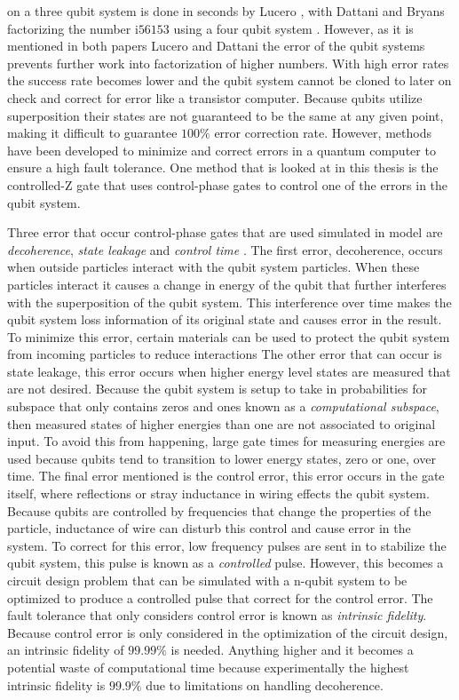 on a three qubit system is done in seconds by Lucero \cite{Lucero2013}, with Dattani and Bryans \cite{Dattani2014} factorizing the number i$56153$ using a four qubit system . However, as it is mentioned in both papers Lucero \cite{Lucero2013} and Dattani \cite{Dattani2014} the error of the qubit systems prevents further work into factorization of higher numbers. With high error rates the success rate becomes lower and the qubit system cannot be cloned to later on check and correct for
error like a transistor computer. Because qubits utilize superposition their states are not guaranteed to be the same at any given point, making it difficult to guarantee $100\%$ error correction rate. However, methods have been developed to minimize and correct errors in a quantum computer to ensure a high fault tolerance. One method that is looked at in this thesis is the controlled-Z gate that uses control-phase gates to control one of the errors in the qubit system. 

Three error that occur control-phase gates that are used simulated in model are \textit{decoherence}, \textit{state leakage} and \textit{control time} \cite{Barends2014}. The first error, decoherence, occurs when outside particles interact with the qubit system particles. When these particles interact it causes a change in energy of the qubit that further interferes with the superposition of the qubit system. This interference over time makes the qubit system loss information of its original
state and causes error in the result. To minimize this error, certain materials can be used to protect the qubit system from incoming particles to reduce interactions
The other error that can occur is state leakage, this error occurs when higher energy level states are measured that are not desired. Because the qubit system is setup to take in probabilities for subspace that only contains zeros and ones known as a \textit{computational subspace}, then measured states of higher energies than one are not associated to original input. To avoid this from happening, large gate times for measuring energies are used because qubits tend to transition to lower
energy states, zero or one, over time.
The final error mentioned is the control error, this error occurs in the gate itself, where reflections or stray inductance in wiring effects the qubit system. Because qubits are controlled by frequencies that change the properties of the particle, inductance of wire can disturb this control and cause error in the system. To correct for this error, low frequency pulses are sent in to stabilize the qubit system, this pulse is known as a \textit{controlled} pulse. However, this becomes a
circuit design problem that can be simulated with a n-qubit system to be optimized to produce a controlled pulse that correct for the control error. The fault tolerance that only considers control error is known as \textit{intrinsic fidelity}. Because control error is only considered in the optimization of the circuit design, an intrinsic fidelity of $99.99\%$ is needed. Anything higher and it becomes a potential waste of computational time because experimentally the highest intrinsic
fidelity is $99.9\%$ due to limitations on handling decoherence. 

